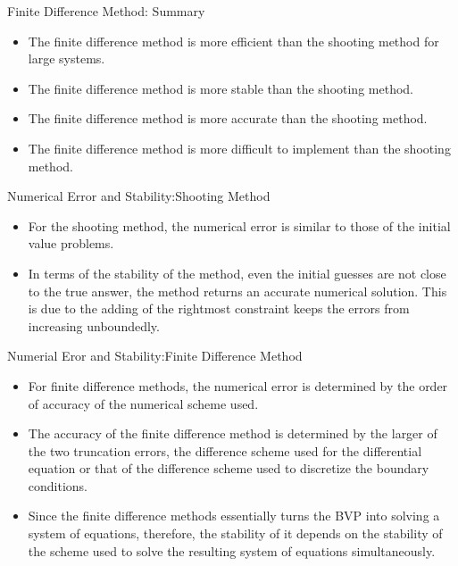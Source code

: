 \documentclass{beamer}
\begin{document}
\begin{frame}{Finite Difference Method: Summary}
    \begin{itemize}
        \item The finite difference method is more efficient than the shooting method for large systems.
        \item The finite difference method is more stable than the shooting method.
        \item The finite difference method is more accurate than the shooting method.
        \item The finite difference method is more difficult to implement than the shooting method.
    \end{itemize}

\end{frame}
\begin{frame}{Numerical Error and Stability:Shooting Method}
    \begin{itemize}
        \item For the shooting method, the numerical error is similar to those of the initial value problems.
        \item In terms of the stability of the method, even the initial guesses are not close to the true answer, the method returns an accurate numerical solution. This is due to the adding of the rightmost constraint keeps the errors from increasing unboundedly.

    \end{itemize}
\end{frame}
\begin{frame}{Numerial Eror and Stability:Finite Difference Method}
\begin{itemize}
    \item   For finite difference methods, the numerical error is determined by the order of accuracy of the numerical scheme used.
    \item  The accuracy of the finite difference method is determined by the larger of the two truncation errors, the difference scheme used for the differential equation or that of the difference scheme used to discretize the boundary conditions.  
    \item Since the finite difference methods essentially turns the BVP into solving a system of equations, therefore, the stability of it depends on the stability of the scheme used to solve the resulting system of equations simultaneously.
            
            
\end{itemize}
\end{frame}
\end{document}
